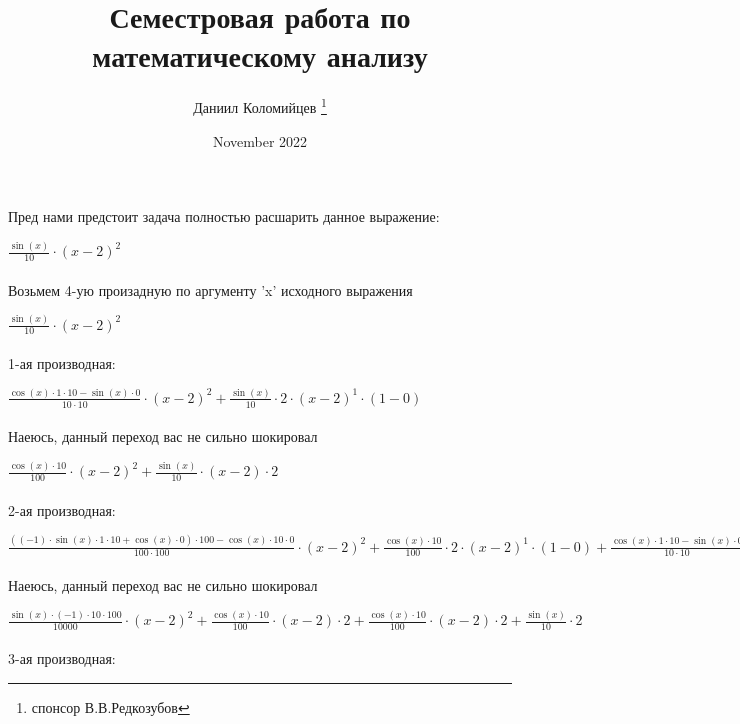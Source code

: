 \documentclass[a4paper, 12pt] {article}
\title{Семестровая работа по математическому анализу}
\author{Даниил Коломийцев \thanks{спонсор В.В.Редкозубов}}
\date{November 2022}
\begin{document}
 
\maketitle
\newpage

Пред нами предстоит задача полностью расшарить данное выражение:

\begin{math}
 \frac { \sin (x)}{10} \cdot (x-2)^{2}
\end{math}
\\
\\
Возьмем 4-ую произадную по аргументу 'x' исходного выражения

\begin{math}
 \frac { \sin (x)}{10} \cdot (x-2)^{2}
\end{math}
\\
\\
1-ая производная:

\begin{math}
 \frac { \cos (x) \cdot 1 \cdot 10- \sin (x) \cdot 0}{10 \cdot 10} \cdot (x-2)^{2}+ \frac { \sin (x)}{10} \cdot 2 \cdot (x-2)^{1} \cdot (1-0)
\end{math}
\\
\\
Наеюсь, данный переход вас не сильно шокировал

\begin{math}
 \frac { \cos (x) \cdot 10}{100} \cdot (x-2)^{2}+ \frac { \sin (x)}{10} \cdot (x-2) \cdot 2
\end{math}
\\
\\
2-ая производная:

\begin{math}
 \frac {((-1) \cdot  \sin (x) \cdot 1 \cdot 10+ \cos (x) \cdot 0) \cdot 100- \cos (x) \cdot 10 \cdot 0}{100 \cdot 100} \cdot (x-2)^{2}+ \frac { \cos (x) \cdot 10}{100} \cdot 2 \cdot (x-2)^{1} \cdot (1-0)+ \frac { \cos (x) \cdot 1 \cdot 10- \sin (x) \cdot 0}{10 \cdot 10} \cdot (x-2) \cdot 2+ \frac { \sin (x)}{10} \cdot ((1-0) \cdot 2+(x-2) \cdot 0)
\end{math}
\\
\\
Наеюсь, данный переход вас не сильно шокировал

\begin{math}
 \frac { \sin (x) \cdot (-1) \cdot 10 \cdot 100}{10000} \cdot (x-2)^{2}+ \frac { \cos (x) \cdot 10}{100} \cdot (x-2) \cdot 2+ \frac { \cos (x) \cdot 10}{100} \cdot (x-2) \cdot 2+ \frac { \sin (x)}{10} \cdot 2
\end{math}
\\
\\
3-ая производная:
\end{document}
